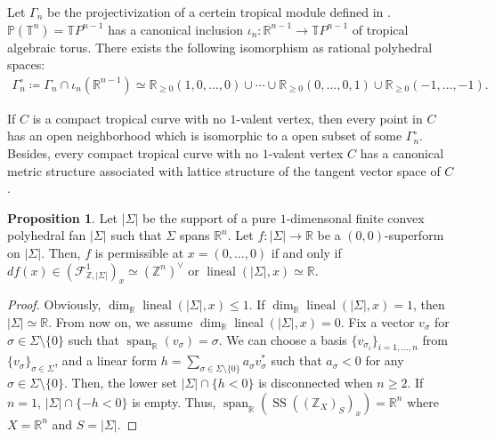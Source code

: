 \documentclass[a4paper,dvipdfmx,reqno,12pt]{amsart}
\theoremstyle{definition}
\newtheorem{proposition}[theorem]{Proposition}
\newcommand{\deq}{\coloneqq}
\newcommand{\opn}[1]{\operatorname{#1}}
\numberwithin{equation}{section}
\begin{document}
Let $\Gamma_{n}$ be the projectivization of 
a certein tropical module defined in 
\cite[2.2]{mikhalkinTropicalCurvesTheir2008a}.
$\mathbb{P}(\mathbb{T}^{n})=\mathbb{T}P^{n-1}$ has a canonical inclusion
$\iota_n\colon \mathbb{R}^{n-1}\to 
\mathbb{T}P^{n-1}$ 
of tropical algebraic torus.
There exists the following isomorphism as rational 
polyhedral spaces:
\begin{align}
\Gamma_{n}^{\circ}\deq \Gamma_{n}\cap \iota_n(\mathbb{R}^{n-1}) \simeq \mathbb{R}_{\geq 0}(1,0,\ldots,0)\cup \cdots
\cup {\mathbb{R}}_{\geq 0}(0,\ldots,0,1)\cup 
{\mathbb{R}}_{\geq 0}(-1,\ldots,-1).
\end{align}

If $C$ is a compact tropical curve with 
no $1$-valent vertex, then every point in $C$ has 
an open neighborhood which is isomorphic to 
a open subset of some $\Gamma_{n}^{\circ}$.
Besides, every compact tropical curve with 
no $1$-valent vertex $C$ has a canonical metric structure 
associated with lattice structure of the tangent 
vector space of $C$ 
\cite[Proposition 3.6]{mikhalkinTropicalCurvesTheir2008a}.


\begin{proposition}
\label{proposition-permissible-curve}
Let $|\Sigma|$ be the support of a pure $1$-dimensonal 
finite convex polyhedral fan $|\Sigma|$ such that
$\Sigma$ spans $\mathbb{R}^{n}$.
Let $f\colon |\Sigma|\to \mathbb{R}$ be a 
$(0,0)$-superform on $|\Sigma|$. Then, 
$f$ is permissible at $x=(0,\ldots,0)$ if and only if 
$df(x)\in (\mathcal{F}^{1}_{\mathbb{Z},|\Sigma|})_x\simeq (\mathbb{Z}^{n})^{\vee}$
or $\opn{lineal}(|\Sigma|,x)\simeq \mathbb{R}$.

\end{proposition}

\begin{proof}
Obviously, 
$\opn{dim}_{\mathbb{R}}\opn{lineal}(|\Sigma|,x)\leq 1$.
If $\opn{dim}_{\mathbb{R}}\opn{lineal}(|\Sigma |,x)=1$, 
then $|\Sigma | \simeq \mathbb{R}$. 
From now on, we assume $\dim_{\mathbb{R}}\opn{lineal}(|\Sigma|,x)=0$.
Fix a vector $v_{\sigma}$ for $\sigma\in \Sigma \setminus\{0\}$ 
such that $\opn{span}_{\mathbb{R}}(v_{\sigma})=\sigma$.
We can choose a basis $\{v_{\sigma_i}\}_{i=1,\ldots, n}$ 
from $\{v_{\sigma}\}_{\sigma \in \Sigma}$,
and a linear form
$h=\sum_{\sigma \in \Sigma \setminus\{0\}} a_\sigma v^{*}_\sigma$
such that $a_\sigma<0$ for any 
$\sigma \in \Sigma \setminus\{0\}$.
Then, the lower set $|\Sigma|\cap \{h< 0\}$ is disconnected
when $n\geq 2$. If $n=1$, $|\Sigma|\cap \{-h<0\}$ is 
empty.
Thus, 
$\opn{span}_{\mathbb{R}}(\opn{SS}((\mathbb{Z}_{X})_S)_x)
=\mathbb{R}^{n}$ where $X=\mathbb{R}^{n}$ and $S=|\Sigma|$.
\end{proof}
\end{document}
